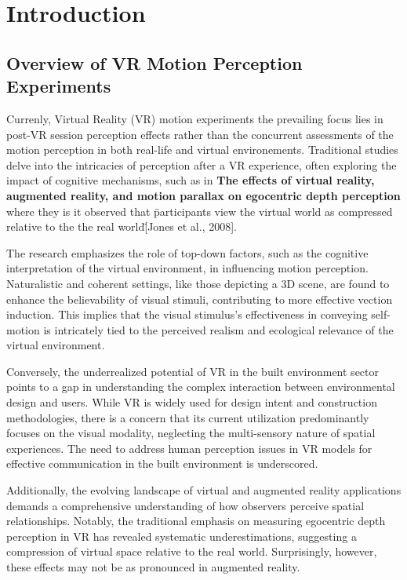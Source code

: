 \documentclass[a4paper, 12pt, oneside]{article}
\begin{document}
    \section{Introduction}
        \subsection{Overview of VR Motion Perception Experiments}

            Currenly, Virtual Reality (VR) motion experiments the prevailing focus
            lies in post-VR session perception effects rather than the concurrent
            assessments of the motion perception in both real-life and virtual environements.
            Traditional studies delve into the intricacies of perception after a VR experience,
            often exploring the impact of cognitive mechanisms, such as in \textbf{The effects of virtual 
            reality, augmented reality, and motion parallax on egocentric depth perception} where 
            they is it observed that \"participants view the virtual world as compressed relative to the 
            the real world\" [Jones et al., 2008].

            The research emphasizes the role of top-down factors, such as the cognitive interpretation of the virtual environment, 
            in influencing motion perception. Naturalistic and coherent settings, like those depicting a 3D scene, are found to 
            enhance the believability of visual stimuli, contributing to more effective vection induction. This implies that the 
            visual stimulus's effectiveness in conveying self-motion is intricately tied to the perceived realism and ecological
             relevance of the virtual environment.

            Conversely, the underrealized potential of VR in the built environment sector points to a gap in understanding the 
            complex interaction between environmental design and users. While VR is widely used for design intent and construction 
            methodologies, there is a concern that its current utilization predominantly focuses on the visual modality, neglecting 
            the multi-sensory nature of spatial experiences. The need to address human perception issues in VR models for effective 
            communication in the built environment is underscored.

            Additionally, the evolving landscape of virtual and augmented reality applications demands a comprehensive understanding 
            of how observers perceive spatial relationships. Notably, the traditional emphasis on measuring egocentric depth 
            perception in VR has revealed systematic underestimations, suggesting a compression of virtual space relative to the 
            real world. Surprisingly, however, these effects may not be as pronounced in augmented reality. 
\end{document}
